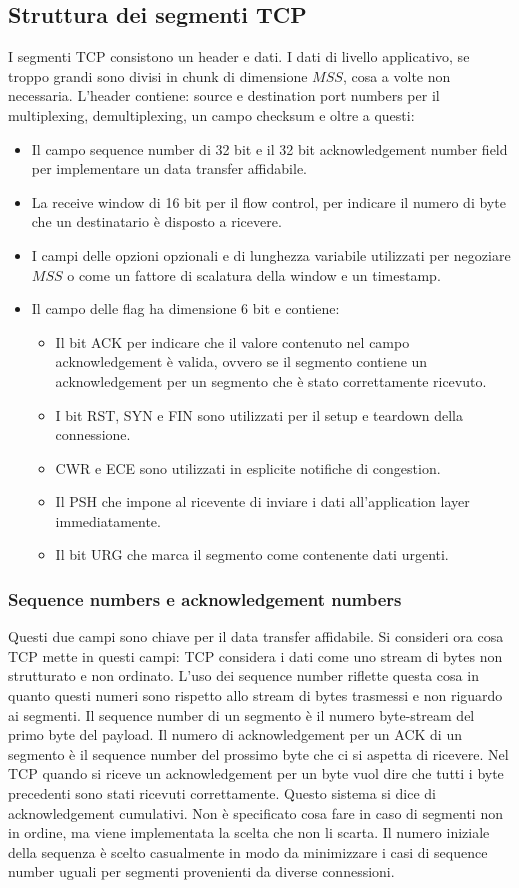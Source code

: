 \subsection{Struttura dei segmenti TCP}
I segmenti TCP consistono un header e dati. I dati di livello applicativo, se troppo grandi sono divisi in chunk di dimensione $MSS$, cosa a volte non 
necessaria. L'header contiene: source e destination port numbers per il multiplexing, demultiplexing, un campo checksum e oltre a questi:
\begin{itemize}
\item Il campo sequence number di 32 bit e il 32 bit acknowledgement number field per implementare un data transfer affidabile.
\item La receive window di 16 bit per il flow control, per indicare il numero di byte che un destinatario \`e disposto a ricevere.
\item I campi delle opzioni opzionali e di lunghezza variabile utilizzati per negoziare $MSS$ o come un fattore di scalatura della window e un timestamp.
\item Il campo delle flag ha dimensione 6 bit e contiene: 
\begin{itemize}
\item Il bit ACK per indicare che il valore contenuto nel campo acknowledgement \`e valida, ovvero se il segmento 
contiene un acknowledgement per un segmento che \`e stato correttamente ricevuto.
\item I bit RST, SYN e FIN sono utilizzati per il setup e teardown della 
connessione.
\item CWR e ECE sono utilizzati in esplicite notifiche di congestion.
\item Il PSH che impone al ricevente di inviare i dati all'application layer
immediatamente.
\item Il bit URG che marca il segmento come contenente dati urgenti. 
\end{itemize}
\end{itemize}
\subsubsection{Sequence numbers e acknowledgement numbers}
Questi due campi sono chiave per il data transfer affidabile. Si consideri ora cosa TCP mette in questi campi: TCP considera i dati come uno stream di bytes 
non strutturato e non ordinato. L'uso dei sequence number riflette questa cosa in quanto questi numeri sono rispetto allo stream di bytes trasmessi e non
riguardo ai segmenti. Il sequence number di un segmento \`e il numero byte-stream del primo byte del payload. Il numero di acknowledgement per un ACK di un segmento \`e il sequence number del prossimo byte che ci si aspetta di ricevere. Nel TCP quando si riceve un acknowledgement per un byte vuol dire che tutti i byte precedenti sono stati ricevuti correttamente. Questo sistema si dice di acknowledgement cumulativi. Non \`e specificato cosa
fare in caso di segmenti non in ordine, ma viene implementata la scelta che non li scarta. Il numero iniziale della sequenza \`e scelto casualmente in modo
da minimizzare i casi di sequence number uguali per segmenti provenienti da diverse connessioni. 
